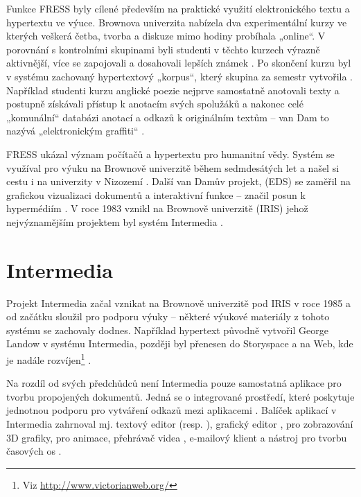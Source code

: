 Funkce FRESS byly cílené především na praktické využití elektronického textu a hypertextu ve výuce. Brownova univerzita nabízela dva experimentální kurzy ve kterých veškerá četba, tvorba a diskuze mimo hodiny probíhala „online“. V porovnání s kontrolními skupinami byli studenti v těchto kurzech výrazně aktivnější, více se zapojovali a dosahovali lepších známek \autocite[219]{Wright2007}.
Po skončení kurzu byl v systému zachovaný hypertextový „korpus“, který skupina za semestr vytvořila \autocite[219]{Wright2007}. Například studenti kurzu anglické poezie nejprve samostatně anotovali texty a postupně získávali přístup k anotacím svých spolužáků a nakonec celé „komunální“ databázi anotací a odkazů k originálním textům -- van Dam to nazývá „elektronickým graffiti“ \autocite[891]{vanDam1988}.

FRESS ukázal význam počítačů a hypertextu pro humanitní vědy. Systém se využíval pro výuku na Brownově univerzitě během sedmdesátých let a našel si cestu i na univerzity v Nizozemí \autocite[110]{Barnet2014}. Další van Damův projekt,  (EDS) se zaměřil na grafickou vizualizaci dokumentů a interaktivní funkce -- značil posun k hypermédiím \autocite[111]{Barnet2014}. V roce 1983 vznikl na Brownově univerzitě  (IRIS) jehož nejvýznamějším projektem byl systém Intermedia \autocite[220]{Wright2007}.

\section{Intermedia}
\label{sec:intermedia}

Projekt Intermedia začal vznikat na Brownově univerzitě pod IRIS v roce 1985 a od začátku sloužil pro podporu výuky -- některé výukové materiály z tohoto systému se zachovaly dodnes. Například hypertext  původně vytvořil George Landow v systému Intermedia, později byl přenesen do Storyspace a na Web, kde je nadále rozvíjen\footnote{Viz \url{http://www.victorianweb.org/}} \autocite[112]{Barnet2014}.

Na rozdíl od svých předchůdců není Intermedia pouze samostatná aplikace pro tvorbu propojených dokumentů. Jedná se o integrované prostředí, které poskytuje jednotnou podporu pro vytváření odkazů mezi aplikacemi \autocite[51]{Nielsen1995}. Balíček aplikací v Intermedia zahrnoval mj. textový editor  (resp. ), grafický editor ,  pro zobrazování 3D grafiky,  pro animace, přehrávač videa , e-mailový klient  a nástroj  pro tvorbu časových os \autocites[82]{Yankelovich1988}{Haan1992}[29]{Muller-Prove2002}.

